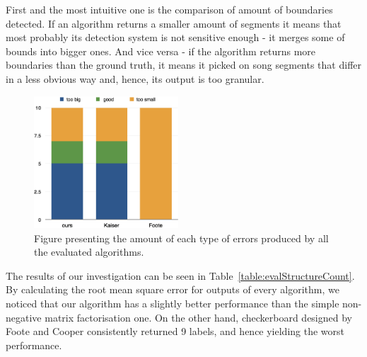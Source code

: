 First and the most intuitive one is the comparison of amount of boundaries detected. If an algorithm returns a smaller amount of segments it means that most probably its detection system is not sensitive enough - it merges some of bounds into bigger ones. And vice versa - if the algorithm returns more boundaries than the ground truth, it means it picked on song segments that differ in a less obvious way and, hence, its output is too granular.



\begin{figure}
\vspace{-10pt}
  \begin{center}
    \includegraphics[width=0.48\textwidth]{Figures/count}
  \end{center}
  \caption{Figure presenting the amount of each type of errors produced by all the evaluated algorithms.}
\label{fig:boundcount}
\end{figure}

The results of our investigation can be seen in Table~\ref{table:evalStructureCount}. By calculating the root mean square error for outputs of every algorithm, we noticed that our algorithm has a slightly better performance than the simple non-negative matrix factorisation one. On the other hand, checkerboard designed by Foote and Cooper consistently returned 9 labels, and hence yielding the worst performance.


